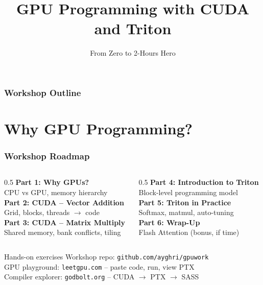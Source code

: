 \documentclass[aspectratio=169]{beamer}
\title{GPU Programming with CUDA and Triton}
\subtitle{From Zero to 2-Hours Hero}
\begin{document}
\frame{\titlepage}

\begin{frame}
	\frametitle{Workshop Outline}
	\tableofcontents
\end{frame}

\section{Why GPU Programming?}

\begin{frame}
	\frametitle{Workshop Roadmap}
	\begin{columns}
		\begin{column}{0.5\textwidth}
			\textbf{\textcolor{codegreen}{Part 1:} Why GPUs?} \\[0.3em]
			CPU vs GPU, memory hierarchy \\[1em]
			\textbf{\textcolor{codegreen}{Part 2:} CUDA -- Vector Addition} \\[0.3em]
			Grid, blocks, threads $\rightarrow$ code \\[1em]
			\textbf{\textcolor{codegreen}{Part 3:} CUDA -- Matrix Multiply} \\[0.3em]
			Shared memory, bank conflicts, tiling
		\end{column}
		\begin{column}{0.5\textwidth}
			\textbf{\textcolor{codegreen}{Part 4:} Introduction to Triton} \\[0.3em]
			Block-level programming model \\[1em]
			\textbf{\textcolor{codegreen}{Part 5:} Triton in Practice} \\[0.3em]
			Softmax, matmul, auto-tuning \\[1em]
			\textbf{\textcolor{codegreen}{Part 6:} Wrap-Up} \\[0.3em]
			Flash Attention (bonus, if time)
		\end{column}
	\end{columns}
	\vspace{0.8em}
	\begin{block}{Hands-on exercises}
		Workshop repo: \texttt{github.com/ayghri/gpuwork} \\
		GPU playground: \texttt{leetgpu.com} -- paste code, run, view PTX \\
		Compiler explorer: \texttt{godbolt.org} -- CUDA $\rightarrow$ PTX $\rightarrow$ SASS
	\end{block}
\end{frame}
\end{document}
